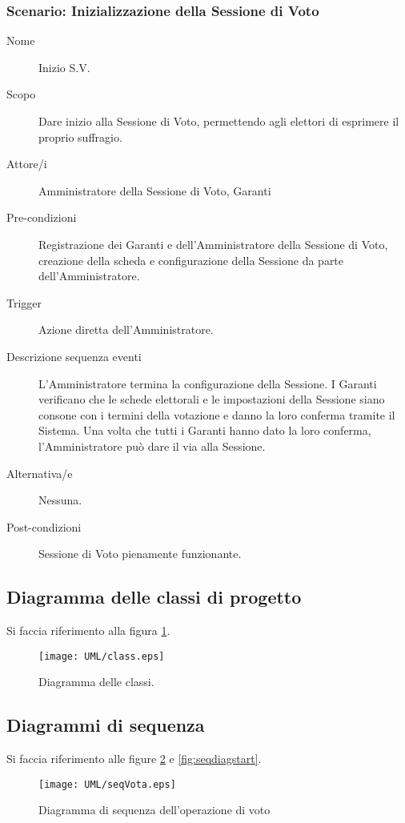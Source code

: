 \subsubsection{Scenario: Inizializzazione della Sessione di Voto}
\begin{description}
	\item[Nome] Inizio S.V.
	\item[Scopo] Dare inizio alla Sessione di Voto, permettendo agli elettori di esprimere il proprio suffragio.
	\item[Attore/i] Amministratore della Sessione di Voto, Garanti
	\item[Pre-condizioni] Registrazione dei Garanti e dell'Amministratore della Sessione di Voto, creazione della scheda e configurazione della Sessione da parte dell'Amministratore.
	\item[Trigger] Azione diretta dell'Amministratore.
	\item[Descrizione sequenza eventi] L'Amministratore termina la configurazione della Sessione. I Garanti verificano che le schede elettorali e le impostazioni della Sessione siano consone con i termini della votazione e danno la loro conferma tramite il Sistema. Una volta che tutti i Garanti hanno dato la loro conferma, l'Amministratore può dare il via alla Sessione.
	\item[Alternativa/e] Nessuna.
	\item[Post-condizioni] Sessione di Voto pienamente funzionante.
\end{description}


\subsection{Diagramma delle classi di progetto}
Si faccia riferimento alla figura \ref{fig:classdiag}.
\begin{figure}[ht]
	\centering
	\texttt{[image: UML/class.eps]}
	\caption{Diagramma delle classi.}
	\label{fig:classdiag}
\end{figure}



\subsection{Diagrammi di sequenza}
Si faccia riferimento alle figure \ref{fig:seqdiagvota} e \ref{fig:seqdiagstart}.
\begin{figure}[ht]
	\centering
	\texttt{[image: UML/seqVota.eps]}
	\caption{Diagramma di sequenza dell'operazione di voto}
	\label{fig:seqdiagvota}
\end{figure}

